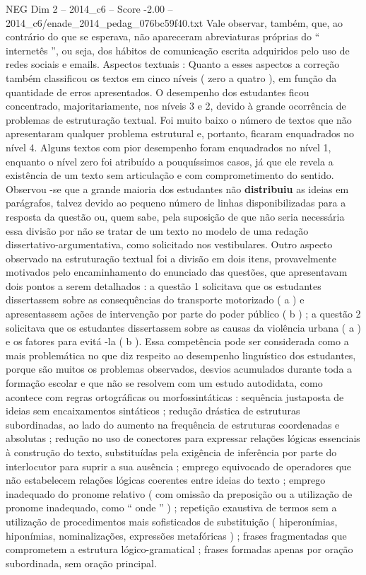 \begin{textsample}{NEG Dim 2 – 2014\_c6 – Score -2.00 – 2014\_c6/enade\_2014\_pedag\_076bc59f40.txt}
Vale observar, também, que, ao contrário do que se esperava, não apareceram abreviaturas próprias do “ internetês ”, ou seja, dos hábitos de comunicação escrita adquiridos pelo uso de redes sociais e emails.
Aspectos textuais : Quanto a esses aspectos a correção também classificou os textos em cinco níveis ( zero a quatro ), em função da quantidade de erros apresentados.
O desempenho dos estudantes ficou concentrado, majoritariamente, nos níveis 3 e 2, devido à grande ocorrência de problemas de estruturação textual.
Foi muito baixo o número de textos que não apresentaram qualquer problema estrutural e, portanto, ficaram enquadrados no nível 4.
Alguns textos com pior desempenho foram enquadrados no nível 1, enquanto o nível zero foi atribuído a pouquíssimos casos, já que ele revela a existência de um texto sem articulação e com comprometimento do sentido.
Observou -se que a grande maioria dos estudantes não \textbf{distribuiu} as ideias em parágrafos, talvez devido ao pequeno número de linhas disponibilizadas para a resposta da questão ou, quem sabe, pela suposição de que não seria necessária essa divisão por não se tratar de um texto no modelo de uma redação dissertativo-argumentativa, como solicitado nos vestibulares.
Outro aspecto observado na estruturação textual foi a divisão em dois itens, provavelmente motivados pelo encaminhamento do enunciado das questões, que apresentavam dois pontos a serem detalhados : a questão 1 solicitava que os estudantes dissertassem sobre as consequências do transporte motorizado ( a ) e apresentassem ações de intervenção por parte do poder público ( b ) ; a questão 2 solicitava que os estudantes dissertassem sobre as causas da violência urbana ( a ) e os fatores para evitá -la ( b ).
Essa competência pode ser considerada como a mais problemática no que diz respeito ao desempenho linguístico dos estudantes, porque são muitos os problemas observados, desvios acumulados durante toda a formação escolar e que não se resolvem com um estudo autodidata, como acontece com regras ortográficas ou morfossintáticas : sequência justaposta de ideias sem encaixamentos sintáticos ; redução drástica de estruturas subordinadas, ao lado do aumento na frequência de estruturas coordenadas e absolutas ; redução no uso de conectores para expressar relações lógicas essenciais à construção do texto, substituídas pela exigência de inferência por parte do interlocutor para suprir a sua ausência ; emprego equivocado de operadores que não estabelecem relações lógicas coerentes entre ideias do texto ; emprego inadequado do pronome relativo ( com omissão da preposição ou a utilização de pronome inadequado, como “ onde ” ) ; repetição exaustiva de termos sem a utilização de procedimentos mais sofisticados de substituição ( hiperonímias, hiponímias, nominalizações, expressões metafóricas ) ; frases fragmentadas que comprometem a estrutura lógico-gramatical ; frases formadas apenas por oração subordinada, sem oração principal.

\end{textsample}
